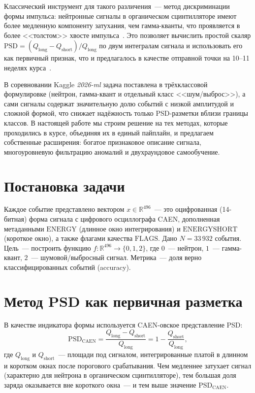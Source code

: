 \documentclass[11pt,a4paper]{article}
\begin{document}
Классический инструмент для такого различения~--- метод дискриминации
формы импульса: нейтронные сигналы в органическом сцинтилляторе
имеют более медленную компоненту затухания, чем гамма-кванты, что
проявляется в более <<толстом>> хвосте импульса~\cite{iaea}. Это
позволяет вычислить простой скаляр
$\mathrm{PSD} = (Q_\text{long} - Q_\text{short}) / Q_\text{long}$
по двум интегралам сигнала и использовать его как первичный признак,
что и предлагалось в качестве отправной точки на 10--11 неделях
курса~\cite{lr10,lr11}.

В соревновании Kaggle \emph{2026-ml} задача поставлена в трёхклассовой
формулировке (нейтрон, гамма-квант и отдельный класс <<шум/выброс>>),
а сами сигналы содержат значительную долю событий с низкой амплитудой
и сложной формой, что снижает надёжность только PSD-разметки вблизи
границы классов. В настоящей работе мы строим решение на тех методах,
которые проходились в курсе, объединяя их в единый пайплайн, и
предлагаем собственные расширения: богатое признаковое описание
сигнала, многоуровневую фильтрацию аномалий и двухраундовое
самообучение.

\section{Постановка задачи}

Каждое событие представлено вектором $x \in \mathbb{R}^{496}$~---
это оцифрованная (14-битная) форма сигнала с цифрового осциллографа
CAEN, дополненная метаданными $\mathrm{ENERGY}$ (длинное окно
интегрирования) и $\mathrm{ENERGYSHORT}$ (короткое окно), а также
флагами качества $\mathrm{FLAGS}$. Дано $N = 33\,932$ события.
Цель~--- построить функцию $f: \mathbb{R}^{496} \to \{0, 1, 2\}$,
где $0$~--- нейтрон, $1$~--- гамма-квант, $2$~--- шумовой/выбросный
сигнал. Метрика~--- доля верно классифицированных событий (accuracy).

\section{Метод PSD как первичная разметка}

В качестве индикатора формы используется CAEN-овское представление PSD:
\begin{equation}
\mathrm{PSD}_\text{CAEN}
= \frac{Q_\text{long} - Q_\text{short}}{Q_\text{long}}
= 1 - \frac{Q_\text{short}}{Q_\text{long}},
\end{equation}
где $Q_\text{long}$ и $Q_\text{short}$~--- площади под сигналом,
интегрированные платой в длинном и коротком окнах после порогового
срабатывания. Чем медленнее затухает сигнал (характерно для нейтрона
в органическом сцинтилляторе), тем большая доля заряда оказывается
вне короткого окна~--- и тем выше значение $\mathrm{PSD}_\text{CAEN}$.
\end{document}
